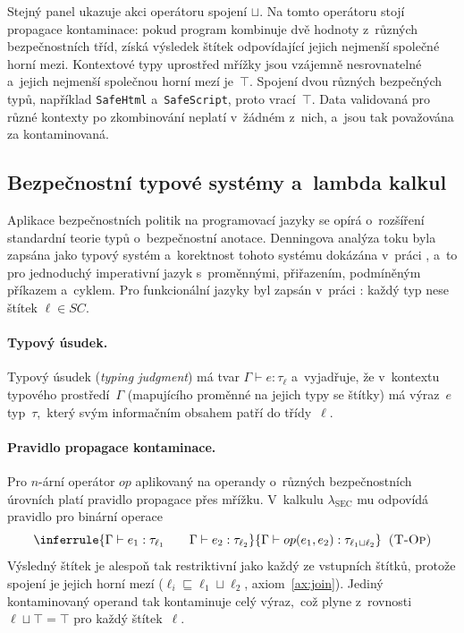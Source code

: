 Stejný panel ukazuje akci operátoru spojení $\sqcup$. Na tomto operátoru stojí propagace kontaminace: pokud program kombinuje dvě hodnoty z~různých bezpečnostních tříd, získá výsledek štítek odpovídající jejich nejmenší společné horní mezi. Kontextové typy uprostřed mřížky jsou vzájemně nesrovnatelné a~jejich nejmenší společnou horní mezí je~$\top$. Spojení dvou různých bezpečných typů, například \texttt{SafeHtml} a~\texttt{SafeScript}, proto vrací~$\top$. Data validovaná pro různé kontexty po zkombinování neplatí v~žádném z~nich, a~jsou tak považována za kontaminovaná.

\subsection{Bezpečnostní typové systémy a~lambda kalkul}

Aplikace bezpečnostních politik na programovací jazyky se opírá o~rozšíření standardní teorie typů o~bezpečnostní anotace. Denningova analýza toku byla zapsána jako typový systém a~korektnost tohoto systému dokázána v~práci \textcite{volpano1996sound}, a~to pro jednoduchý imperativní jazyk s~proměnnými, přiřazením, podmíněným příkazem a~cyklem. Pro funkcionální jazyky byl zapsán v~práci \textcite{zdancewic2002thesis}: každý typ nese štítek $\ell \in SC$.

\paragraph{Typový úsudek.}
Typový úsudek (\emph{typing judgment}) má tvar $\Gamma \vdash e : \tau_\ell$ a~vyjadřuje, že v~kontextu typového prostředí~$\Gamma$ (mapujícího proměnné na jejich typy se štítky) má výraz~$e$ typ~$\tau$,~který svým informačním obsahem patří do třídy~$\ell$.

\paragraph{Pravidlo propagace kontaminace.}
Pro $n$-ární operátor $op$ aplikovaný na operandy o~různých bezpečnostních úrovních platí pravidlo propagace přes mřížku. V~kalkulu $\lambda_{\mathrm{SEC}}$ mu odpovídá pravidlo pro binární operace \parencite{zdancewic2002thesis}
\begin{equation}
    \inferrule{\Gamma \vdash e_1 : \tau_{\ell_1} \qquad \Gamma \vdash e_2 : \tau_{\ell_2}}
              {\Gamma \vdash op(e_1, e_2) : \tau_{\ell_1 \sqcup \ell_2}}\;\;\textsc{(T-Op)}
    \label{eq:t-op}
\end{equation}
Výsledný štítek je alespoň tak restriktivní jako každý ze vstupních štítků, protože spojení je jejich horní mezí ($\ell_i \sqsubseteq \ell_1 \sqcup \ell_2$, axiom~\ref{ax:join}). Jediný kontaminovaný operand tak kontaminuje celý výraz,~což plyne z~rovnosti $\ell \sqcup \top = \top$ pro každý štítek~$\ell$.

